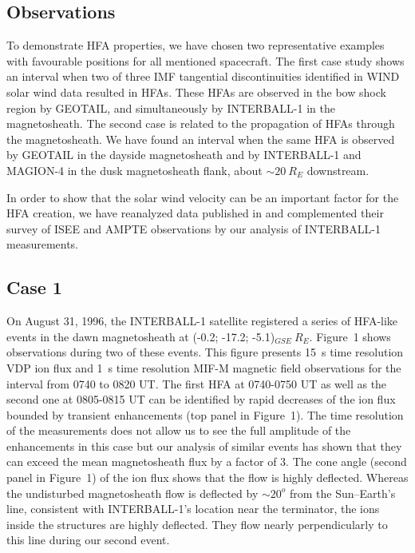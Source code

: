 \documentclass[11pt]{article}
\begin{document}
\begin{article}
\section{Observations}
To demonstrate HFA properties, we have chosen two representative
examples with favourable positions for all mentioned spacecraft.
The first case study shows an interval when two of three IMF tangential
discontinuities identified in WIND solar wind data resulted in HFAs.
These HFAs are observed in the bow shock region by GEOTAIL,
and simultaneously by
INTERBALL-1 in the magnetosheath. The second case is related to the
propagation of HFAs through the magnetosheath. We have found an
interval when the same HFA is observed by GEOTAIL in the dayside
magnetosheath and by INTERBALL-1 and MAGION-4 in the dusk
magnetosheath flank, about $\sim 20\> R_E$ downstream.

In order to
show that the solar wind velocity can be an important factor for the
HFA creation, we have reanalyzed data published in
\citep{ona} and
complemented their survey of ISEE and AMPTE observations by our
analysis of INTERBALL-1 measurements.

\subsection{Case 1}
On August 31, 1996, the INTERBALL-1 satellite
registered a series of HFA-like events in the dawn magnetosheath
at (-0.2; -17.2; -5.1)$_{GSE}\> R_E$. Figure~1 shows observations during two of
these events.  This figure presents 15~s
time resolution VDP ion flux \citep{ku} and 1~s time resolution MIF-M magnetic field
\citep{kl} observations for the interval
from 0740 to 0820 UT.
The first HFA at 0740-0750 UT as well as the second one at
0805-0815 UT can be identified by rapid decreases of the ion flux
bounded by transient enhancements (top panel in Figure~1). The time
resolution of the measurements does not allow us to see the full
amplitude of the enhancements in this case but our analysis of
similar events has shown that they can exceed the mean magnetosheath flux
by a factor of 3.
The cone angle (second panel in Figure~1) of the ion flux shows
that the flow is highly deflected. Whereas the undisturbed
magnetosheath flow is deflected by $\sim 20^o$ from the
Sun--Earth's line, consistent with INTERBALL-1's location near
the terminator, the ions inside the structures are highly
deflected. They flow nearly perpendicularly to this line during our
second event.


\end{article}
\end{document}

